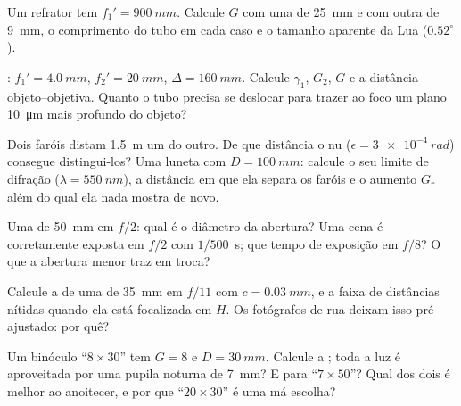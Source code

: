\begin{exercise}[$\star$]\label{exo:b1:optical-instruments:4}
Um refrator tem $f_1' = \qty{900}{mm}$. Calcule $G$ com uma  de \qty{25}{mm}
e com outra de \qty{9}{mm}, o comprimento do tubo em cada caso e o
tamanho aparente da Lua ($0.52^\circ$).
\end{exercise}

\begin{exercise}[$\star\star$]\label{exo:b1:optical-instruments:5}
: $f_1' = \qty{4.0}{mm}$, $f_2' = \qty{20}{mm}$,
$\Delta = \qty{160}{mm}$. Calcule $\gamma_1$, $G_2$, $G$ e a
distância objeto--objetiva. Quanto o tubo precisa se deslocar para trazer ao foco
um plano \qty{10}{\micro m} mais profundo do objeto?
\end{exercise}

\begin{exercise}[$\star\star$]\label{exo:b1:optical-instruments:6}
Dois faróis distam \qty{1.5}{m} um do outro. De que distância o
 nu ($\epsilon = \qty{3e-4}{rad}$) consegue distingui-los? Uma luneta
com $D = \qty{100}{mm}$: calcule o seu limite de difração ($\lambda =
\qty{550}{nm}$), a distância em que ela separa os faróis e
o aumento $G_r$ além do qual ela nada mostra de novo.
\end{exercise}

\begin{exercise}[$\star\star$]\label{exo:b1:optical-instruments:7}
Uma  de \qty{50}{mm} em $f/2$: qual é o diâmetro da abertura? Uma cena é
corretamente exposta em $f/2$ com $1/500$~\unit{s}; que tempo de exposição em
$f/8$? O que a abertura menor traz em troca?
\end{exercise}

\begin{exercise}[$\star\star$]\label{exo:b1:optical-instruments:8}
Calcule a  de uma  de \qty{35}{mm} em $f/11$ com
$c = \qty{0.03}{mm}$, e a faixa de distâncias nítidas quando ela está
focalizada em $H$. Os fotógrafos de rua deixam isso pré-ajustado: por quê?
\end{exercise}

\begin{exercise}[$\star\star$]\label{exo:b1:optical-instruments:9}
Um binóculo ``$8\times30$'' tem $G = 8$ e $D = \qty{30}{mm}$. Calcule
a ; toda a luz é aproveitada por uma pupila noturna de \qty{7}{mm}? E para
``$7\times50$''? Qual dos dois é melhor ao anoitecer, e por que ``$20\times30$''
é uma má escolha?
\end{exercise}

